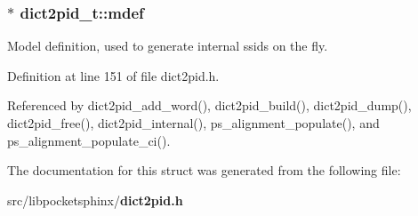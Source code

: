 \subsubsection[{mdef}]{$\ast$ dict2pid\-\_\-t\-::mdef}\label{structdict2pid__t_ab0dcb283a0cf5ad40836bc418fd535b3}


Model definition, used to generate internal ssids on the fly. 



Definition at line 151 of file dict2pid.\-h.



Referenced by dict2pid\-\_\-add\-\_\-word(), dict2pid\-\_\-build(), dict2pid\-\_\-dump(), dict2pid\-\_\-free(), dict2pid\-\_\-internal(), ps\-\_\-alignment\-\_\-populate(), and ps\-\_\-alignment\-\_\-populate\-\_\-ci().



The documentation for this struct was generated from the following file\-:\begin{DoxyCompactItemize}
\item 
src/libpocketsphinx/{\bf dict2pid.\-h}\end{DoxyCompactItemize}

